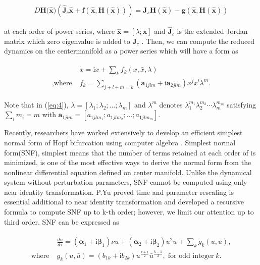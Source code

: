 \documentclass[openacc]{rsproca_new}%
\def\vec#1{\ensuremath{\mathbf{#1}}}
\newcommand{\Eref}[1]{(\ref{#1})}
\begin{document}
\begin{align}\label{eq:3}
    D\vec{H}({\vec{\hat{x})}}(\vec{\hat{J}}_c\vec{\hat{x}}+\vec{f}(\vec{\hat{x}},\vec{H}(\vec{\hat{x}}))) =\vec{J}_s \vec{H}(\vec{\hat{x}})-\vec{g}(\vec{\hat{x}},\vec{H}(\vec{\hat {x}}))
\end{align}

\noindent at each order of power series, where \(\vec{\hat{x}}=[\lambda;\vec{x}]\) and \(\vec{\hat{J}}_c\) is the extended Jordan matrix which zero eigenvalue is added to \(\vec{J}_c\) \cite{bi1999symbolic}. Then, we can compute the reduced dynamics on the centermanifold as a power series which will have a form as

\begin{align}\label{eq:4}
  \begin{split}
    {}&\dot{x} =\textrm{i} x+\sum_k f_k(x,\bar{x},\lambda)\\
    ,\textrm{where} \; & f_k=\sum_{j+l+m=k}(\vec{a}_{1jlm}+\textrm{i}\vec{a}_{2jlm})x^j\bar{x}^l\lambda^m.
  \end{split}
\end{align}

\noindent Note that in \Eref{eq:4}, \(\lambda=[\lambda_1;\lambda_2;\ldots;\lambda_m]\) and \(\lambda^m\) denotes \(\lambda_1^{m_1}\lambda_2^{m_2}\cdots\lambda_m^{m_m}\) satisfying \(\sum_i m_i = m\) with \(\vec{a}_{1jlm}=[a_{1jlm_1};a_{1jlm_2};\ldots;a_{1jlm_m}]\).

Recently, researchers have worked extensively to develop an efficient simplest normal form of Hopf bifurcation using computer algebra \cite{algaba1998hypernormal,yu1998computation}. Simplest normal form(SNF), simplest means that the number of terms retained at each order of is minimized, is one of the most effective ways to derive the normal form from the nonlinear differential equation defined on center manifold. Unlike the dynamical system without perturbation parameters, SNF cannot be computed using only near identity transformation. P.Yu\cite{yu2002simplest} proved time and parameter rescaling is essential additional to near identity transformation and developed a recursive formula to compute SNF up to k-th order; however, we limit our attention up to third order. SNF can be expressed as

\begin{align}\label{eq:5}
\begin{split}
&\frac{du}{d\tau}=(\vec{\alpha}_1+\textrm{i}\vec{\beta}_1)\nu u+(\vec{\alpha}_2+\textrm{i}\vec{\beta}_2) u^2 \bar{u}+\sum_k g_k(u,\bar{u}),\\
\textrm{where} \;  &g_k(u,\bar{u})=(b_{1k}+\textrm{i}b_{2k})u^{\frac{k+1}{2}}\bar{u}^{\frac{k-1}{2}}, \; \textrm{for odd integer} \;k.
\end{split}
\end{align}
\end{document}
